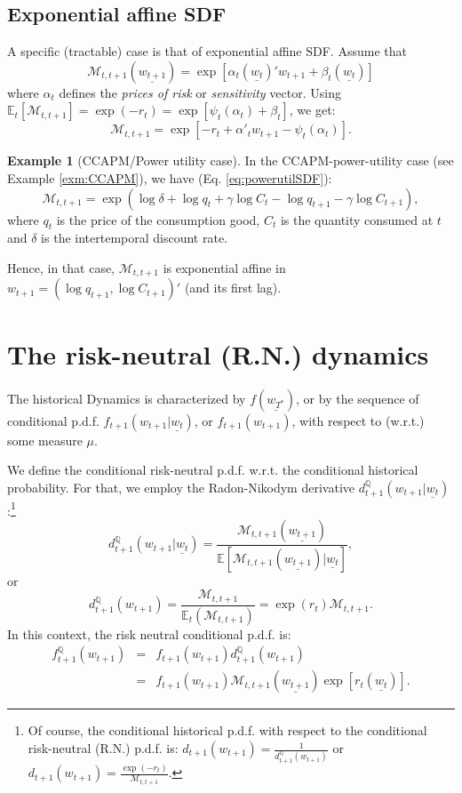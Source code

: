 \documentclass[
  12pt,
]{book}
\theoremstyle{definition}
\theoremstyle{definition}
\newtheorem{example}{Example}[chapter]
\theoremstyle{definition}
\theoremstyle{definition}
\theoremstyle{remark}
\begin{document}
\hypertarget{PricingAffine}{%
\subsection{Exponential affine SDF}\label{PricingAffine}}

A specific (tractable) case is that of exponential affine SDF. Assume that
\[
\mathcal{M}_{t,t+1}(\underline{w_{t+1}}) = \exp[\alpha_t(\underline{w_t})'w_{t+1}+\beta_t(\underline{w_t})]
\]
where \(\alpha_t\) defines the \emph{prices of risk} or \emph{sensitivity} vector. Using \(\mathbb{E}_t[\mathcal{M}_{t,t+1}]=\exp(-r_{t})=\exp[\psi_t(\alpha_t)+\beta_t]\), we get:
\begin{equation}
\mathcal{M}_{t,t+1} = \exp[-r_{t}+\alpha'_tw_{t+1}-\psi_t(\alpha_t)].\label{eq:keySDF}
\end{equation}

\begin{example}[CCAPM/Power utility case]
In the CCAPM-power-utility case (see Example \ref{exm:CCAPM}), we have (Eq. \eqref{eq:powerutilSDF}):
\[
\mathcal{M}_{t,t+1} = \exp(\log \delta + \log q_t + \gamma \log   C_t - \log   q_{t+1} - \gamma  \log   C_{t+1}),
\]
where \(q_t\) is the price of the consumption good, \(C_t\) is the quantity consumed at \(t\) and \(\delta\) is the intertemporal discount rate.

Hence, in that case, \(\mathcal{M}_{t,t+1}\) is exponential affine in \(w_{t+1} = (\log q_{t+1}, \log C_{t+1})'\) (and its first lag).
\end{example}

\hypertarget{PricingRN}{%
\section{The risk-neutral (R.N.) dynamics}\label{PricingRN}}

The historical Dynamics is characterized by \(f(\underline{w_{T^*}})\), or by the
sequence of conditional p.d.f. \(f_{t+1}(w_{t+1}|\underline{w_t})\), or
\(f_{t+1}(w_{t+1})\), with respect to (w.r.t.) some measure \(\mu\).

We define the conditional risk-neutral p.d.f. w.r.t. the conditional historical probability. For that, we employ the Radon-Nikodym derivative \(d^{\mathbb{Q}}_{t+1}(w_{t+1}|\underline{w_t})\):\footnote{Of course, the conditional historical p.d.f. with respect to the conditional risk-neutral (R.N.) p.d.f. is:
  \(d_{t+1}(w_{t+1}) = \frac{1}{d^{\mathbb{Q}}_{t+1}(w_{t+1})}\) or \(d_{t+1}(w_{t+1}) = \frac{\exp(-r_{t})}{\mathcal{M}_{t,t+1}}\).}
\[
d^{\mathbb{Q}}_{t+1}(w_{t+1}|\underline{w_t}) =
\frac{\mathcal{M}_{t,t+1}(\underline{w_{t+1}})}{\mathbb{E}[\mathcal{M}_{t,t+1}(\underline{w_{t+1}})|\underline{w_t}]},
\]
or
\[
d^{\mathbb{Q}}_{t+1}(w_{t+1})=
\frac{\mathcal{M}_{t,t+1}}{\mathbb{E}_t(\mathcal{M}_{t,t+1})}=\exp(r_{t}) \mathcal{M}_{t,t+1}.
\]
In this context, the risk neutral conditional p.d.f. is:
\begin{eqnarray}
f^{\mathbb{Q}}_{t+1}(w_{t+1}) &=& f_{t+1}(w_{t+1})d^{\mathbb{Q}}_{t+1}(w_{t+1}) \nonumber \\
&=&f_{t+1} (w_{t+1}) \mathcal{M}_{t,t+1} (\underline{w_{t+1}}) \exp [r_{t} (\underline{w_t})].\label{eq:fQfP}
\end{eqnarray}
\end{document}
